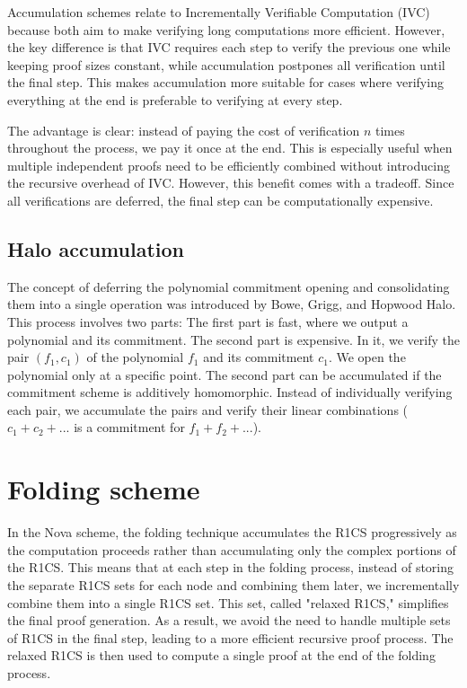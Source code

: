 Accumulation schemes relate to Incrementally Verifiable Computation (IVC) because both aim to make verifying long computations more efficient. 
However, the key difference is that IVC requires each step to verify the previous one while keeping proof sizes constant, while accumulation postpones all verification until the final step. 
This makes accumulation more suitable for cases where verifying everything at the end is preferable to verifying at every step.

The advantage is clear: instead of paying the cost of verification $n$ times throughout the process, we pay it once at the end. 
This is especially useful when multiple independent proofs need to be efficiently combined without introducing the recursive overhead of IVC. 
However, this benefit comes with a tradeoff. Since all verifications are deferred, the final step can be computationally expensive.\cite{BB20}


\subsection{Halo accumulation}
The concept of deferring the polynomial commitment opening and consolidating them into a single operation was introduced by Bowe, Grigg, and Hopwood Halo.\cite{BGH23}
This process involves two parts:
The first part is fast, where we output a polynomial and its commitment.
The second part is expensive. In it, we verify the pair $(f_1, c_1)$ of the polynomial $f_1$ and its commitment $c_1$. We open the polynomial only at a specific point.
The second part can be accumulated if the commitment scheme is additively homomorphic. 
Instead of individually verifying each pair, we accumulate the pairs and verify their linear combinations ($c_1+c_2+...$ is a commitment for $f_1+f_2+...$). \cite{VR23}


\section{Folding scheme}
In the Nova scheme, the folding technique accumulates the R1CS progressively as the computation proceeds rather than accumulating only the complex portions of the R1CS. 
This means that at each step in the folding process, instead of storing the separate R1CS sets for each node and combining them later, we incrementally combine them into a single R1CS set. \cite{Nova23}
This set, called "relaxed R1CS," simplifies the final proof generation.
As a result, we avoid the need to handle multiple sets of R1CS in the final step, leading to a more efficient recursive proof process. 
The relaxed R1CS is then used to compute a single proof at the end of the folding process.

